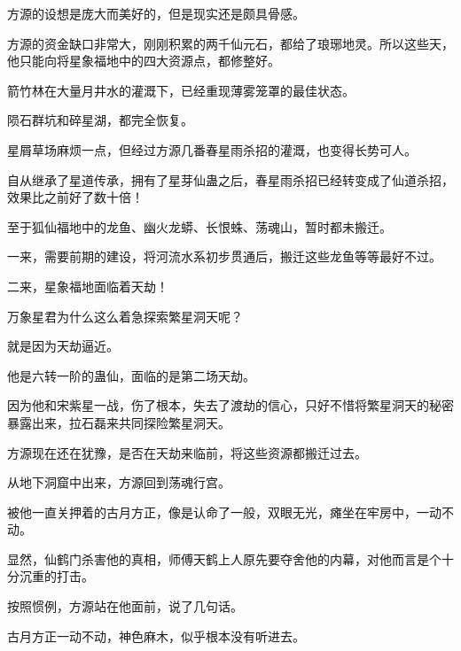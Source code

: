 \begin{this_body}
方源的设想是庞大而美好的，但是现实还是颇具骨感。

方源的资金缺口非常大，刚刚积累的两千仙元石，都给了琅琊地灵。所以这些天，他只能向将星象福地中的四大资源点，都修整好。

箭竹林在大量月井水的灌溉下，已经重现薄雾笼罩的最佳状态。

陨石群坑和碎星湖，都完全恢复。

星屑草场麻烦一点，但经过方源几番春星雨杀招的灌溉，也变得长势可人。

自从继承了星道传承，拥有了星芽仙蛊之后，春星雨杀招已经转变成了仙道杀招，效果比之前好了数十倍！

至于狐仙福地中的龙鱼、幽火龙蟒、长恨蛛、荡魂山，暂时都未搬迁。

一来，需要前期的建设，将河流水系初步贯通后，搬迁这些龙鱼等等最好不过。

二来，星象福地面临着天劫！

万象星君为什么这么着急探索繁星洞天呢？

就是因为天劫逼近。

他是六转一阶的蛊仙，面临的是第二场天劫。

因为他和宋紫星一战，伤了根本，失去了渡劫的信心，只好不惜将繁星洞天的秘密暴露出来，拉石磊来共同探险繁星洞天。

方源现在还在犹豫，是否在天劫来临前，将这些资源都搬迁过去。

从地下洞窟中出来，方源回到荡魂行宫。

被他一直关押着的古月方正，像是认命了一般，双眼无光，瘫坐在牢房中，一动不动。

显然，仙鹤门杀害他的真相，师傅天鹤上人原先要夺舍他的内幕，对他而言是个十分沉重的打击。

按照惯例，方源站在他面前，说了几句话。

古月方正一动不动，神色麻木，似乎根本没有听进去。

\end{this_body}

